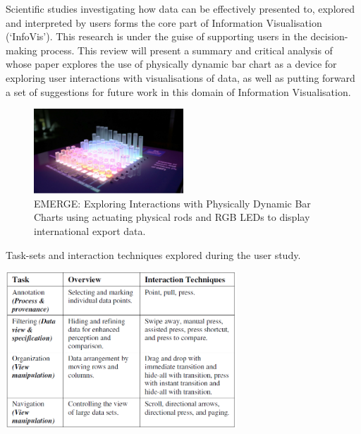 \documentclass[11pt]{article}
\begin{document}
Scientific studies investigating how data can be effectively presented to, explored and interpreted by users forms the core part of Information Visualisation (`InfoVis'). This research is under the guise of supporting users in the decision-making process. This review will present a summary and critical analysis of \citet{taher2015} whose paper explores the use of physically dynamic bar chart as a device for exploring user interactions with visualisations of data, as well as putting forward a set of suggestions for future work in this domain of Information Visualisation.


\begin{figure}[H]
\centering
\includegraphics[width=0.5\textwidth]{img/taher2015-emerge.png} 
\caption{EMERGE: Exploring Interactions with Physically Dynamic Bar Charts using actuating physical rods and RGB LEDs to display international export data.}\label{fig:taher2015-emerge}
\end{figure}

\begin{table}[H]
\centering
\caption{Task-sets and interaction techniques explored during the user study.}\label{tbl:taher2015-user-study}
\includegraphics[width=0.65\textwidth]{img/taher2015-user-study.png} 
\end{table}

\end{document}
